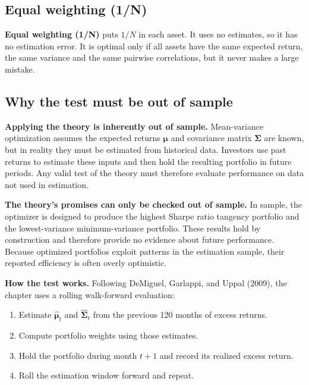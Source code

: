 \subsection{Equal weighting (1/N)}
\label{sec:12-equal}

\textbf{Equal weighting (1/N)} puts $1/N$ in each asset. It uses no estimates, so it has no estimation error. It is optimal only if all assets have the same expected return, the same variance and the same pairwise correlations, but it never makes a large mistake.

\subsection{Why the test must be out of sample}
\label{sec:12-oos}

\textbf{Applying the theory is inherently out of sample.} Mean-variance optimization assumes the expected returns $\boldsymbol{\mu}$ and covariance matrix $\boldsymbol{\Sigma}$ are known, but in reality they must be estimated from historical data. Investors use past returns to estimate these inputs and then hold the resulting portfolio in future periods. Any valid test of the theory must therefore evaluate performance on data not used in estimation.

\textbf{The theory's promises can only be checked out of sample.} In sample, the optimizer is designed to produce the highest Sharpe ratio tangency portfolio and the lowest-variance minimum-variance portfolio. These results hold by construction and therefore provide no evidence about future performance. Because optimized portfolios exploit patterns in the estimation sample, their reported efficiency is often overly optimistic. 

\textbf{How the test works.} Following DeMiguel, Garlappi, and Uppal (2009), the chapter uses a rolling walk-forward evaluation:
\begin{enumerate}
    \item Estimate $\hat{\boldsymbol{\mu}}_t$ and $\hat{\boldsymbol{\Sigma}}_t$ from the previous 120 months of excess returns.
    \item Compute portfolio weights using those estimates.
    \item Hold the portfolio during month $t+1$ and record its realized excess return.
    \item Roll the estimation window forward and repeat.
\end{enumerate}

